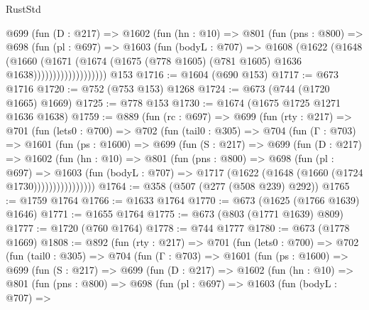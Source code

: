 \begin{lexlean}{RustStd}
\begin{coremodule}
{\begin{coremodule}
{{{{{{{{{{                  @699
                    (fun (D : @217) =>
                    @1602
                      (fun (hn : @10) =>
                      @801
                        (fun (pns : @800) =>
                        @698
                          (fun (pl : @697) =>
                          @1603
                            (fun (bodyL : @707) =>
                            @1608
                              (@1622
                                (@1648
                                  (@1660
                                    (@1671
                                      (@1674
                                        (@1675
                                          (@778 @1605)
                                          (@781 @1605)
                                          @1636
                                          @1638)))))))))))))))))))
    @153
@1716 := @1604 (@690 @153)
@1717 := @673 @1716
@1720 := @752 (@753 @153) @1268
@1724 := @673 (@744 (@1720 @1665) @1669)
@1725 := @778 @153
@1730 := @1674 (@1675 @1725 @1271 @1636 @1638)
@1759 := @889
    (fun (rc : @697) =>
    @699
      (fun (rty : @217) =>
      @701
        (fun (lets0 : @700) =>
        @702
          (fun (tail0 : @305) =>
          @704
            (fun (Γ : @703) =>
            @1601
              (fun (ps : @1600) =>
              @699
                (fun (S : @217) =>
                @699
                  (fun (D : @217) =>
                  @1602
                    (fun (hn : @10) =>
                    @801
                      (fun (pns : @800) =>
                      @698
                        (fun (pl : @697) =>
                        @1603
                          (fun (bodyL : @707) =>
                          @1717 (@1622 (@1648 (@1660 (@1724 @1730))))))))))))))))
@1764 := @358 (@507 (@277 (@508 @239) @292))
@1765 := @1759 @1764
@1766 := @1633 @1764
@1770 := @673 (@1625 (@1766 @1639) @1646)
@1771 := @1655 @1764
@1775 := @673 (@803 (@1771 @1639) @809)
@1777 := @1720 (@760 @1764)
@1778 := @744 @1777
@1780 := @673 (@1778 @1669)
@1808 := @892
    (fun (rty : @217) =>
    @701
      (fun (lets0 : @700) =>
      @702
        (fun (tail0 : @305) =>
        @704
          (fun (Γ : @703) =>
          @1601
            (fun (ps : @1600) =>
            @699
              (fun (S : @217) =>
              @699
                (fun (D : @217) =>
                @1602
                  (fun (hn : @10) =>
                  @801
                    (fun (pns : @800) =>
                    @698
                      (fun (pl : @697) =>
                      @1603
                        (fun (bodyL : @707) =>
}}}}}}}}}}
\end{coremodule}}
\end{coremodule}
\end{lexlean}
